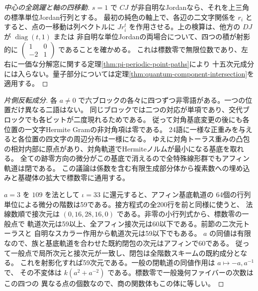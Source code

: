 \begin{proof}[中心の全跳躍と軸の四移動]
$s=1$ で $CJ$ が非自明なJordanなら、それを上三角の標準単位Jordan行列とする。
最初の純色の軸上で、各辺の二文字関係を $r_i$ とすると、点の一移動は列ベクトルに
$Jr_i^t$ を作用させる。上の検算は、他方の $DJ$ が $\operatorname{diag}(t,1)$ または
非自明な単位Jordanの両場合について、四つの積が射影的に
$\left(\begin{smallmatrix}1&0\\-2&1\end{smallmatrix}\right)$ であることを確かめる。
これは標数零で無限位数であり、左右に一価な分解窓に関する定理\ref{thm:pi-periodic-point-paths}により
十五次元成分には入らない。量子部分については定理\ref{thm:quantum-component-intersection}を適用する。
\end{proof}
\begin{proof}[片側反転成分]
各 $a\ne0$ で六ブロックの各々に四つずつ非零語がある。一つの位置だけ異なる二語はない。
同じブロックでは二つの対応が単項であり、交代ブロックでも各ビットが二度現れるためである。
従って対角基底変更の後にも各位置の一文字Hermite Gramの非対角項は零である。
24語に一様な正重みを与えると各位置の四文字の周辺分布は一様になる。
ゆえに対角トーラス重みの凸包の相対内部に原点があり、対角軌道でHermiteノルムが最小になる基底を取れる。
全ての跡零方向の微分がこの基底で消えるので全特殊線形群でもアフィン軌道は閉である。
この議論は係数を含む有限生成部分体から複素数への埋め込みと基礎体の拡大で標数零に通用する。

$a=3$ を $109$ を法として $\iota=33$ に還元すると、アフィン基底軌道の
64個の行列単位による微分の階数は59である。接方程式の全200行を前と同様に使うと、
法線数順で接次元は $(0,16,28,16,0)$ である。非零の小行列式から、標数零の一般点で
軌道次元は59以上、全アフィン接次元は60以下である。前節の二次元トーラスと
自明なスカラー作用から軌道次元は59以下でもある。
$a$ の同値は有限なので、族と基底軌道を合わせた既約閉包の次元はアフィンで60である。
従って一般点で局所次元と接次元が一致し、閉包は全階数スキームの既約成分となる。
これを射影化すれば59次元である。一般の閉軌道の同値作用は $a\mapsto-a,a^{-1}$ で、
その不変体は $k(a^2+a^{-2})$ である。標数零で一般幾何ファイバーの次数はこの四つの
異なる点の個数なので、商の関数体もこの体に等しい。
\end{proof}
